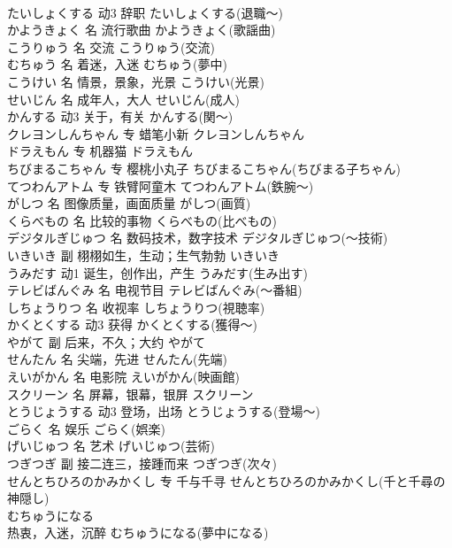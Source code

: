 \documentclass[8pt]{extreport}
\begin{document}
\begin{CJK}{UTF8}{min}
\\	たいしょくする	动3	辞职	たいしょくする(退職～)	
\\	かようきょく	名	流行歌曲	かようきょく(歌謡曲)	
\\	こうりゅう	名	交流	こうりゅう(交流)	
\\	むちゅう	名	着迷，入迷	むちゅう(夢中)	
\\	こうけい	名	情景，景象，光景	こうけい(光景)	
\\	せいじん	名	成年人，大人	せいじん(成人)	
\\	かんする	动3	关于，有关	かんする(関～)	
\\	クレヨンしんちゃん	专	蜡笔小新	クレヨンしんちゃん	
\\	ドラえもん	专	机器猫	ドラえもん	
\\	ちびまるこちゃん	专	樱桃小丸子	ちびまるこちゃん(ちびまる子ちゃん)	
\\	てつわんアトム	专	铁臂阿童木	てつわんアトム(鉄腕～)	
\\	がしつ	名	图像质量，画面质量	がしつ(画質)	
\\	くらべもの	名	比较的事物	くらべもの(比べもの)	
\\	デジタルぎじゅつ	名	数码技术，数字技术	デジタルぎじゅつ(～技術)	
\\	いきいき	副	栩栩如生，生动；生气勃勃	いきいき	
\\	うみだす	动1	诞生，创作出，产生	うみだす(生み出す)	
\\	テレビばんぐみ	名	电视节目	テレビばんぐみ(～番組)	
\\	しちょうりつ	名	收视率	しちょうりつ(視聴率)	
\\	かくとくする	动3	获得	かくとくする(獲得～)	
\\	やがて	副	后来，不久；大约	やがて	
\\	せんたん	名	尖端，先进	せんたん(先端)	
\\	えいがかん	名	电影院	えいがかん(映画館)	
\\	スクリーン	名	屏幕，银幕，银屏	スクリーン	
\\	とうじょうする	动3	登场，出场	とうじょうする(登場～)	
\\	ごらく	名	娱乐	ごらく(娯楽)	
\\	げいじゅつ	名	艺术	げいじゅつ(芸術)	
\\	つぎつぎ	副	接二连三，接踵而来	つぎつぎ(次々)	
\\	せんとちひろのかみかくし	专	千与千寻	せんとちひろのかみかくし(千と千尋の神隠し)	
\\	むちゅうになる	
\\	热衷，入迷，沉醉	むちゅうになる(夢中になる)	

\end{CJK}
\end{document}

